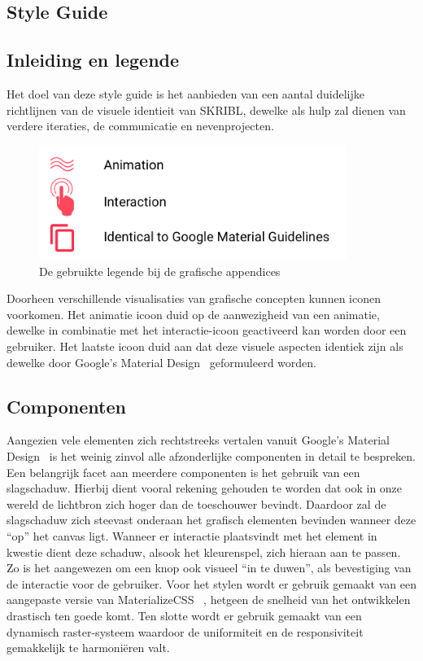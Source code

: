 \documentclass{article}
\begin{document}
\begin{appendices} 
\section{Style Guide}
\subsection{Inleiding en legende}
Het doel van deze style guide is het aanbieden van een aantal duidelijke richtlijnen van de visuele identieit van SKRIBL, dewelke als hulp zal dienen van verdere iteraties, de communicatie en nevenprojecten.
\begin{figure}[!h]
\centering
 \includegraphics[width=100mm]{pieteruploads/SKRBL_FRNT_Legende.png}
 \caption{De gebruikte legende bij de grafische appendices }
\end{figure}
Doorheen verschillende visualisaties van grafische concepten kunnen iconen voorkomen. Het animatie icoon duid op de aanwezigheid van een animatie, dewelke in combinatie met het interactie-icoon geactiveerd kan worden door een gebruiker. Het laatste icoon duid aan dat deze visuele aspecten identiek zijn als dewelke door Google’s Material Design~\cite{website:Material} geformuleerd worden.

\subsection{Componenten}

Aangezien vele elementen zich rechtstreeks vertalen vanuit Google’s Material Design~\cite{website:Material} is het weinig zinvol alle afzonderlijke componenten in detail te bespreken. Een belangrijk facet aan meerdere componenten is het gebruik van een slagschaduw. Hierbij dient vooral rekening gehouden te worden dat ook in onze wereld de lichtbron zich hoger dan de toeschouwer bevindt. Daardoor zal de slagschaduw zich steevast onderaan het grafisch elementen bevinden wanneer deze “op” het canvas ligt. Wanneer er interactie plaatsvindt met het element in kwestie dient deze schaduw, alsook het kleurenspel, zich hieraan aan te passen. Zo is het aangewezen om een knop ook visueel “in te duwen”, als bevestiging van de interactie voor de gebruiker. Voor het stylen wordt er gebruik gemaakt van een aangepaste versie van MaterializeCSS ~\cite{website:materialize}, hetgeen de snelheid van het ontwikkelen drastisch ten goede komt. Ten slotte wordt er gebruik gemaakt van een dynamisch raster-systeem waardoor de uniformiteit en de responsiviteit gemakkelijk te harmoniëren valt. 


\end{appendices}
\end{document}
